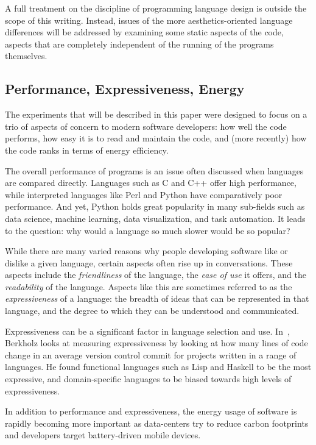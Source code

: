 A full treatment on the discipline of programming language design is outside the scope of this writing. Instead, issues of the more aesthetics-oriented language differences will be addressed by examining some static aspects of the code, aspects that are completely independent of the running of the programs themselves.

\subsection{Performance, Expressiveness, Energy}

The experiments that will be described in this paper were designed to focus on a trio of aspects of concern to modern software developers: how well the code performs, how easy it is to read and maintain the code, and (more recently) how the code ranks in terms of energy efficiency.

The overall performance of programs is an issue often discussed when languages are compared directly. Languages such as C and C++ offer high performance, while interpreted languages like Perl and Python have comparatively poor performance. And yet, Python holds great popularity in many sub-fields such as data science, machine learning, data visualization, and task automation. It leads to the question: why would a language so much slower would be so popular?

While there are many varied reasons why people developing software like or dislike a given language, certain aspects often rise up in conversations. These aspects include the \textit{friendliness} of the language, the \textit{ease of use} it offers, and the \textit{readability} of the language. Aspects like this are sometimes referred to as the \textit{expressiveness} of a language: the breadth of ideas that can be represented in that language, and the degree to which they can be understood and communicated.

Expressiveness can be a significant factor in language selection and use. In~\cite{berkholz}, Berkholz looks at measuring expressiveness by looking at how many lines of code change in an average version control commit for projects written in a range of languages. He found functional languages such as Lisp and Haskell to be the most expressive, and domain-specific languages to be biased towards high levels of expressiveness.

In addition to performance and expressiveness, the energy usage of software is rapidly becoming more important as data-centers try to reduce carbon footprints and developers target battery-driven mobile devices.

